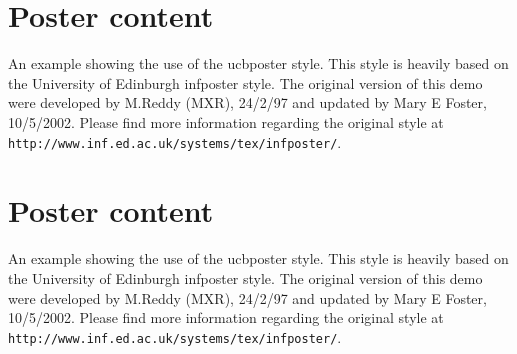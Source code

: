 \documentclass{ucbposter}
\begin{document}
\section{Poster content}

An example showing the use of the ucbposter style. This style is
heavily based on the University of Edinburgh infposter style. The
original version of this demo were developed by M.Reddy (MXR), 24/2/97
and updated by Mary E Foster, 10/5/2002. Please find more information
regarding the original style at {\tt
http://www.inf.ed.ac.uk/systems/tex/infposter/}.

\section{Poster content}

An example showing the use of the ucbposter style. This style is
heavily based on the University of Edinburgh infposter style. The
original version of this demo were developed by M.Reddy (MXR), 24/2/97
and updated by Mary E Foster, 10/5/2002. Please find more information
regarding the original style at {\tt
http://www.inf.ed.ac.uk/systems/tex/infposter/}.
\end{document}
